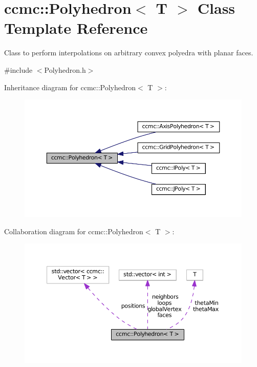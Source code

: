 \hypertarget{classccmc_1_1_polyhedron}{\section{ccmc\-:\-:Polyhedron$<$ T $>$ Class Template Reference}
\label{classccmc_1_1_polyhedron}
}


Class to perform interpolations on arbitrary convex polyedra with planar faces.  




{\ttfamily \#include $<$Polyhedron.\-h$>$}



Inheritance diagram for ccmc\-:\-:Polyhedron$<$ T $>$\-:\nopagebreak
\begin{figure}[H]
\begin{center}
\leavevmode
\includegraphics[width=350pt]{classccmc_1_1_polyhedron__inherit__graph}
\end{center}
\end{figure}


Collaboration diagram for ccmc\-:\-:Polyhedron$<$ T $>$\-:\nopagebreak
\begin{figure}[H]
\begin{center}
\leavevmode
\includegraphics[width=350pt]{classccmc_1_1_polyhedron__coll__graph}
\end{center}
\end{figure}
